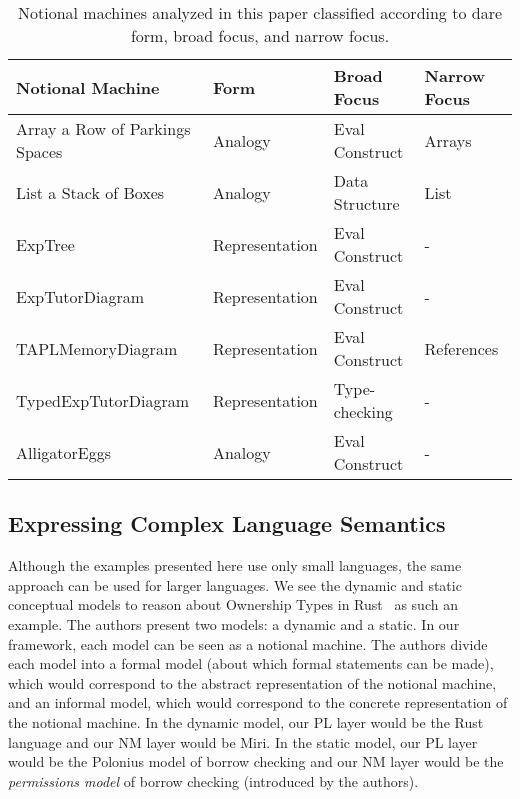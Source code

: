 \begin{table}[]
\begin{tabular}{|l||l|l|l|}
\hline
\textbf{Notional Machine}      & \textbf{Form} & \textbf{Broad Focus} & \textbf{Narrow Focus} \\ \hline
\hline
\hline
Array a Row of Parkings Spaces & Analogy        & Eval Construct & Arrays       \\ \hline
List a Stack of Boxes          & Analogy        & Data Structure & List         \\ \hline
ExpTree                        & Representation & Eval Construct & -            \\ \hline
ExpTutorDiagram                & Representation & Eval Construct & -            \\ \hline
TAPLMemoryDiagram              & Representation & Eval Construct & References   \\ \hline
TypedExpTutorDiagram           & Representation & Type-checking  & -            \\ \hline
AlligatorEggs                  & Analogy        & Eval Construct & -            \\ \hline
\end{tabular}
\caption{Notional machines analyzed in this paper classified according to dare form, broad focus, and narrow focus.}
\label{tab:our-nm-classification}
\end{table}

\subsection{Expressing Complex Language Semantics}
\label{sec:more-complexity}

Although the examples presented here use only small languages,
the same approach can be used for larger languages.
We see
the dynamic and static conceptual models
to reason about Ownership Types in Rust~\citep{crichtonGroundedConceptualModel2023}
as such an example.
The authors present two models: a dynamic and a static.
In our framework,
each model can be seen as a notional machine.
The authors divide each model into a formal model (about which formal statements can be made), which would correspond to the abstract representation of the notional machine,
and an informal model, which would correspond to the concrete representation of the notional machine.
%
In the dynamic model,
our PL layer would be the Rust language
and
our NM layer would be Miri.
%
In the static model,
our PL layer would be the Polonius model of borrow checking
and
our NM layer would be the \emph{permissions model} of borrow checking
(introduced by the authors).

